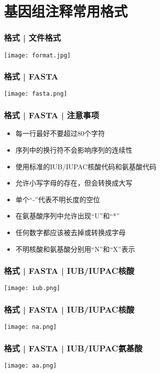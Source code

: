\documentclass[table]{beamer}
\begin{document}
\section{基因组注释常用格式}
\begin{frame}
  \frametitle{格式 | 文件格式}
    \begin{center}
      \texttt{[image: format.jpg]}
    \end{center}
\end{frame}

\begin{frame}
  \frametitle{格式 | FASTA}
    \begin{center}
      \texttt{[image: fasta.png]}
    \end{center}
\end{frame}

\begin{frame}
  \frametitle{格式 | FASTA | 注意事项}
  \begin{itemize}
    \item 每一行最好不要超过80个字符
    \item 序列中的换行符不会影响序列的连续性
    \item 使用标准的IUB/IUPAC核酸代码和氨基酸代码
    \item 允许小写字母的存在，但会转换成大写
    \item 单个“-”代表不明长度的空位
    \item 在氨基酸序列中允许出现“U”和“*”
    \item 任何数字都应该被去掉或转换成字母
    \item 不明核酸和氨基酸分别用“N”和“X”表示
  \end{itemize}
\end{frame}

\begin{frame}
  \frametitle{格式 | FASTA | IUB/IUPAC核酸}
    \begin{center}
      \texttt{[image: iub.png]}
    \end{center}
\end{frame}

\begin{frame}
  \frametitle{格式 | FASTA | IUB/IUPAC核酸}
    \begin{center}
      \texttt{[image: na.png]}
    \end{center}
\end{frame}

\begin{frame}
  \frametitle{格式 | FASTA | IUB/IUPAC氨基酸}
    \begin{center}
      \texttt{[image: aa.png]}
    \end{center}
\end{frame}
\end{document}

